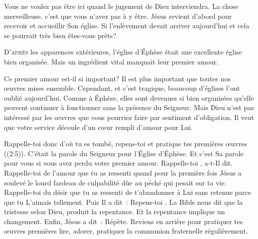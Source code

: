 Vous ne voulez pas être ici quand le jugement de Dieu interviendra.
 La chose merveilleuse, c'est que vous n'avez pas à y être.
 Jésus revient d'abord pour recevoir et accueillir Son église. 
 Si l'enlèvement devait arriver aujourd'hui
 \ocadr et cela se pourrait très bien \fcadr{} êtes-vous prêts? 

\dvrule






\lettrine{D}{'après} les apparences extérieures,
 l'église d'Éphèse était une excellente église bien organisée.
 Mais un ingrédient vital manquait \ocadr leur premier amour. 

Ce premier amour est-il si important?
 Il est plus important que toutes nos \oe{}uvres mises ensemble.
 Cependant, et c'est tragique,
 beaucoup d'églises l'ont oublié aujourd'hui.
 Comme à Éphèse, elles sont devenues si bien organisées
 qu'elle peuvent continuer à fonctionner sans la présence du Seigneur.
 Mais Dieu n'est pas intéressé par les \oe{}uvres que vous pourriez faire
 par sentiment d'obligation. Il veut que votre service découle
 d'un c\oe{}ur rempli d'amour pour Lui. 


\og Rappelle-toi donc d'où tu es tombé, repens-toi
 et pratique tes premières \oe{}uvres \fg{} ((2:5)).
 C'était la parole du Seigneur pour l'Église d'Éphèse.
 Et c'est Sa parole pour vous si vous avez perdu votre premier amour.
 \og Rappelle-toi \fg{},  a-t-Il dit.
 Rappelle-toi de l'amour que tu as ressenti quand pour la première fois
 Jésus a soulevé le lourd fardeau de culpabilité dûe au péché
 qui pesait sur ta vie. Rappelle-toi du désir que tu as ressenti
 de t'abandonner à Lui sans retenue parce que tu L'aimais tellement.
 Puis Il a dit~:  \og Repens-toi \fg{}.
 La Bible nous dit que la tristesse selon Dieu, produit la repentance.
 Et la repentance implique un changement. Enfin, Jésus a dit~: 
 \og Répète. \fg{} Reviens en arrière pour pratiquer tes \oe{}uvres premières
 \ocadr lire, adorer, pratiquer la communion fraternelle régulièrement. 

